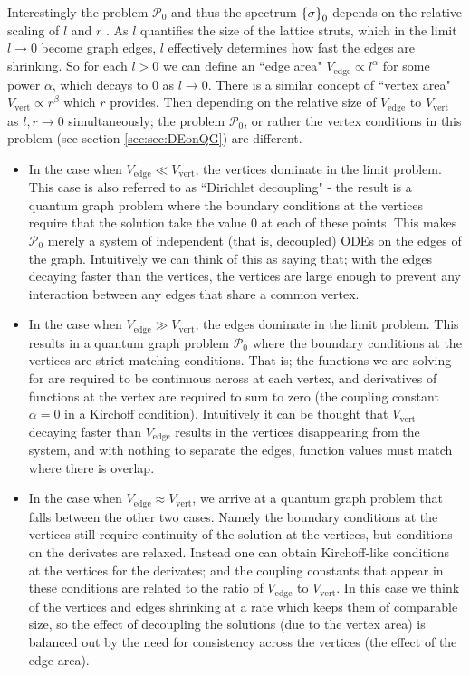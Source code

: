 Interestingly the problem $\mathcal{P}_0$ and thus the spectrum $\left\{ \sigma \right\}_0$ depends on the relative scaling of $l$ and $r$ \cite{exner2005convergence} .
As $l$ quantifies the size of the lattice struts, which in the limit $l\rightarrow0$ become graph edges, $l$ effectively determines how fast the edges are shrinking.
So for each $l>0$ we can define an ``edge area" $V_{\mathrm{edge}} \propto l^{\alpha}$ for some power $\alpha$, which decays to 0 as $l\rightarrow0$.
There is a similar concept of ``vertex area" $V_{\mathrm{vert}} \propto r^{\beta}$ which $r$ provides.
Then depending on the relative size of $V_{\mathrm{edge}}$ to $V_{\mathrm{vert}}$ as $l,r\rightarrow0$ simultaneously; the problem $\mathcal{P}_0$, or rather the vertex conditions in this problem (see section \ref{sec:sec:DEonQG}) are different.
\begin{itemize}
	\item In the case when $V_{\mathrm{edge}} \ll V_{\mathrm{vert}}$, the vertices dominate in the limit problem.
	This case is also referred to as ``Dirichlet decoupling" - the result is a quantum graph problem where the boundary conditions at the vertices require that the solution take the value 0 at each of these points.
	This makes $\mathcal{P}_0$ merely a system of independent (that is, decoupled) ODEs on the edges of the graph.
	Intuitively we can think of this as saying that; with the edges decaying faster than the vertices, the vertices are large enough to prevent any interaction between any edges that share a common vertex.
	\item In the case when $V_{\mathrm{edge}} \gg V_{\mathrm{vert}}$, the edges dominate in the limit problem.
	This results in a quantum graph problem $\mathcal{P}_0$ where the boundary conditions at the vertices  are strict matching conditions.
	That is; the functions we are solving for are required to be continuous across at each vertex, and derivatives of functions at the vertex are required to sum to zero (the coupling constant $\alpha=0$ in a Kirchoff condition).
	Intuitively it can be thought that $V_{\mathrm{vert}}$ decaying faster than $V_{\mathrm{edge}}$ results in the vertices disappearing from the system, and with nothing to separate the edges, function values must match where there is overlap.
	\item In the case when $V_{\mathrm{edge}} \approx V_{\mathrm{vert}}$, we arrive at a quantum graph problem that falls between the other two cases.
	Namely the boundary conditions at the vertices still require continuity of the solution at the vertices, but conditions on the derivates are relaxed.
	Instead one can obtain Kirchoff-like conditions at the vertices for the derivates; and the coupling constants that appear in these conditions are related to the ratio of $V_{\mathrm{edge}}$ to $V_{\mathrm{vert}}$.
	In this case we think of the vertices and edges shrinking at a rate which keeps them of comparable size, so the effect of decoupling the solutions (due to the vertex area) is balanced out by the need for consistency across the vertices (the effect of the edge area).
\end{itemize}

